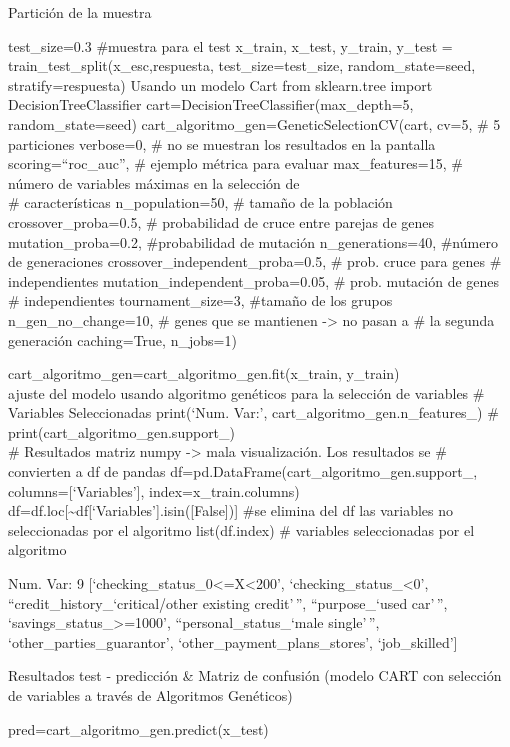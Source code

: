 \documentclass[
  a4paper,
  DIV=11,
  numbers=noendperiod]{scrreprt}
\begin{document}
Partición de la muestra

test\_size=0.3 \#muestra para el test x\_train, x\_test, y\_train,
y\_test = train\_test\_split(x\_esc,respuesta, test\_size=test\_size,
random\_state=seed, stratify=respuesta) Usando un modelo Cart from
sklearn.tree import DecisionTreeClassifier
cart=DecisionTreeClassifier(max\_depth=5, random\_state=seed)
cart\_algoritmo\_gen=GeneticSelectionCV(cart, cv=5, \# 5 particiones
verbose=0, \# no se muestran los resultados en la pantalla
scoring=``roc\_auc'', \# ejemplo métrica para evaluar max\_features=15,
\# número de variables máximas en la selección de\\
\# características n\_population=50, \# tamaño de la población
crossover\_proba=0.5, \# probabilidad de cruce entre parejas de genes
mutation\_proba=0.2, \#probabilidad de mutación n\_generations=40,
\#número de generaciones crossover\_independent\_proba=0.5, \# prob.
cruce para genes \# independientes mutation\_independent\_proba=0.05, \#
prob. mutación de genes \# independientes tournament\_size=3, \#tamaño
de los grupos n\_gen\_no\_change=10, \# genes que se mantienen
-\textgreater{} no pasan a \# la segunda generación caching=True,
n\_jobs=1)

cart\_algoritmo\_gen=cart\_algoritmo\_gen.fit(x\_train, y\_train)\\
ajuste del modelo usando algoritmo genéticos para la selección de
variables \# Variables Seleccionadas print(`Num. Var:',
cart\_algoritmo\_gen.n\_features\_) \#
print(cart\_algoritmo\_gen.support\_)\\
\# Resultados matriz numpy -\textgreater{} mala visualización. Los
resultados se \# convierten a df de pandas
df=pd.DataFrame(cart\_algoritmo\_gen.support\_,
columns={[}`Variables'{]}, index=x\_train.columns)
df=df.loc{[}\textasciitilde df{[}`Variables'{]}.isin({[}False{]}){]}
\#se elimina del df las variables no seleccionadas por el algoritmo
list(df.index) \# variables seleccionadas por el algoritmo

Num. Var: 9 {[}`checking\_status\_0\textless=X\textless200',
`checking\_status\_\textless0', ``credit\_history\_`critical/other
existing credit'\,'', ``purpose\_`used car'\,'',
`savings\_status\_\textgreater=1000', ``personal\_status\_`male
single'\,'', `other\_parties\_guarantor',
`other\_payment\_plans\_stores', `job\_skilled'{]}

Resultados test - predicción \& Matriz de confusión (modelo CART con
selección de variables a través de Algoritmos Genéticos)

pred=cart\_algoritmo\_gen.predict(x\_test)
\end{document}
